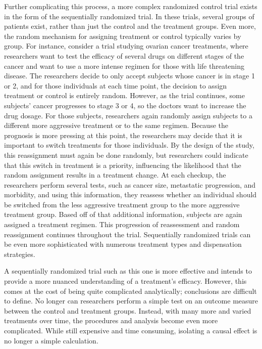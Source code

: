 Further complicating this process, a more complex randomized control trial exists in the form of the sequentially randomized trial.  In these trials, several groups of patients exist, rather than just the control and the treatment groups.  Even more, the random mechanism for assigning treatment or control typically varies by group.  For instance, consider a trial studying ovarian cancer treatments, where researchers want to test the efficacy of several drugs on different stages of the cancer and want to use a more intense regimen for those with life threatening disease.  The researchers decide to only accept subjects whose cancer is in stage 1 or 2, and for those individuals at each time point, the decision to assign treatment or control is entirely random.  However, as the trial continues, some subjects' cancer progresses to stage 3 or 4, so the doctors want to increase the drug dosage.  For those subjects, researchers again randomly assign subjects to a different more aggressive treatment or to the same regimen.  Because the prognosis is more pressing at this point, the researchers may decide that it is important to switch treatments for those individuals.  By the design of the study, this reassignment must again be done randomly, but researchers could indicate that this switch in treatment is a priority, influencing the likelihood that the random assignment results in a treatment change.  At each checkup, the researchers perform several tests, such as cancer size, metastatic progression, and morbidity, and using this information, they reassess whether an individual should be switched from the less aggressive treatment group to the more aggressive treatment group. Based off of that additional information, subjects are again assigned a treatment regimen.  This progression of reassessment and random reassignment continues throughout the trial.  Sequentially randomized trials can be even more sophisticated with numerous treatment types and dispensation strategies.\cite{doi:10.1093/jnci/djm185}  

A sequentially randomized trial such as this one is more effective and intends to provide a more nuanced understanding of a treatment's efficacy.  However, this comes at the cost of being quite complicated analytically; conclusions are difficult to define.  No longer can researchers perform a simple test on an outcome measure between the control and treatment groups.  Instead, with many more and varied treatments over time, the procedures and analysis become even more complicated.  While still expensive and time consuming, isolating a causal effect is no longer a simple calculation.  
 
